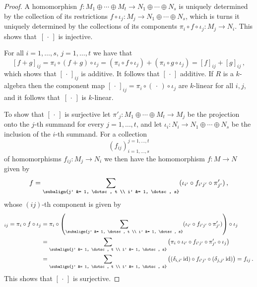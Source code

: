 \begin{proof}
  A homomorphisn $f \colon M_1 \oplus \dotsb \oplus M_t \to N_1 \oplus \dotsb \oplus N_s$ is uniquely determined by the collection of its restrictions $f \circ \iota_j \colon M_j \to N_1 \oplus \dotsb \oplus N_s$, which is turns it uniquely determined by the collections of its components $\pi_i \circ f \circ \iota_j \colon M_j \to N_i$.
  This shows that~$[\,\cdot\,]$ is injective.
  
  For all $i = 1, \dotsc, s$, $j = 1, \dotsc, t$ we have that
  \[
      [f+g]_{ij}
    = \pi_i \circ (f+g) \circ \iota_j
    = (\pi_i \circ f \circ \iota_j) + (\pi_i \circ g \circ \iota_j)
    = [f]_{ij} + [g]_{ij} \,,
  \]
  which shows that $[\,\cdot\,]_{ij}$ is additive.
  It follows that $[\,\cdot\,]$ additive.
  If $R$ is a $k$-algebra then the component map $[\,\cdot\,]_{ij} = \pi_i \circ (\,\cdot\,) \circ \iota_j$ are $k$-linear for all $i, j$, and it follows that~$[\,\cdot\,]$ is $k$-linear.
  
  To show that $[\,\cdot\,]$ is surjective let $\pi'_j \colon M_1 \oplus \dotsb \oplus M_t \to M_j$ be the projection onto the $j$-th summand for every $j = 1, \dotsc, t$, and let $\iota_i \colon N_i \to N_1 \oplus \dotsb \oplus N_s$ be the inclusion of the $i$-th summand.
  For a collection
  \[
    (f_{ij})^{j = 1, \dotsc, t}_{i = 1, \dotsc, s}
  \]
  of homomorphisms $f_{ij} \colon M_j \to N_i$ we then have the homomorphism $f \colon M \to N$ given by
  \[
      f
    = \sum_{\subalign{j' &= 1, \dotsc, t \\ i' &= 1, \dotsc, s}}
      (\iota_{i'} \circ f_{i'j'} \circ \pi'_{j'}) \,,
  \]
  whose $(ij)$-th component is given by
  \begin{align*}
        [f]_{ij}
     =  \pi_i \circ f \circ \iota_j
    &=  \pi_i
        \circ
        \left(
          \sum_{\subalign{j' &= 1, \dotsc, t \\ i' &= 1, \dotsc, s}}
          (\iota_{i'} \circ f_{i'j'} \circ \pi'_{j'})
        \right)
        \circ
        \iota_j \\
    &=  \sum_{\subalign{j' &= 1, \dotsc, t \\ i' &= 1, \dotsc, s}}
        \big(
          \pi_i \circ \iota_{i'} \circ f_{i'j'} \circ \pi'_{j'} \circ \iota_j
        \big) \\
    &=  \sum_{\subalign{j' &= 1, \dotsc, t \\ i' &= 1, \dotsc, s}}
        \big(
          (\delta_{i,i'} \id) \circ f_{i'j'} \circ (\delta_{j,j'} \id)
        \big)
     =  f_{ij} \,.
  \end{align*}
  This shows that $[\,\cdot\,]$ is surjective.
\end{proof}


